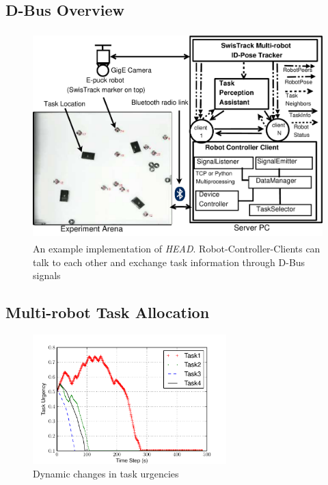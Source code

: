 \documentclass{ifacconf}
\begin{document}
\subsection{D-Bus Overview}
\begin{figure}
\begin{center}
\includegraphics[width=12cm,height=8cm]{./dia-files/RIL-Expt-Setup3}    %
\caption{An example implementation of {\em HEAD}. Robot-Controller-Clients can talk to each other and exchange task information through D-Bus signals} 
\label{fig:abstract-arch}
\end{center}
\end{figure}

\subsection{Multi-robot Task Allocation}
\begin{figure}
\begin{center}
\includegraphics[width=7.5cm,height=5cm]{./images/PlotUrgencyLog-2010Feb15-171017}    %
\caption{Dynamic changes in task urgencies} 
\label{fig:task-urgency}
\end{center}
\end{figure}
\end{document}
